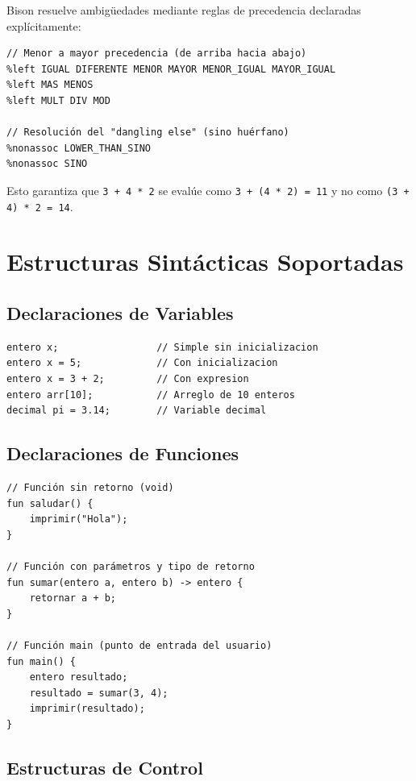 Bison resuelve ambigüedades mediante reglas de precedencia declaradas explícitamente:

\begin{lstlisting}[style=cstyle, caption={Declaraciones de precedencia}]
// Menor a mayor precedencia (de arriba hacia abajo)
%left IGUAL DIFERENTE MENOR MAYOR MENOR_IGUAL MAYOR_IGUAL
%left MAS MENOS
%left MULT DIV MOD

// Resolución del "dangling else" (sino huérfano)
%nonassoc LOWER_THAN_SINO
%nonassoc SINO
\end{lstlisting}

Esto garantiza que \texttt{3 + 4 * 2} se evalúe como \texttt{3 + (4 * 2) = 11} y no como \texttt{(3 + 4) * 2 = 14}.

\section{Estructuras Sintácticas Soportadas}

\subsection{Declaraciones de Variables}

\begin{lstlisting}[style=tppstyle, caption={Formas válidas de declaración}]
entero x;                 // Simple sin inicializacion
entero x = 5;             // Con inicializacion
entero x = 3 + 2;         // Con expresion
entero arr[10];           // Arreglo de 10 enteros
decimal pi = 3.14;        // Variable decimal
\end{lstlisting}

\subsection{Declaraciones de Funciones}

\begin{lstlisting}[style=tppstyle, caption={Formas de declaración de funciones}]
// Función sin retorno (void)
fun saludar() {
    imprimir("Hola");
}

// Función con parámetros y tipo de retorno
fun sumar(entero a, entero b) -> entero {
    retornar a + b;
}

// Función main (punto de entrada del usuario)
fun main() {
    entero resultado;
    resultado = sumar(3, 4);
    imprimir(resultado);
}
\end{lstlisting}

\subsection{Estructuras de Control}

